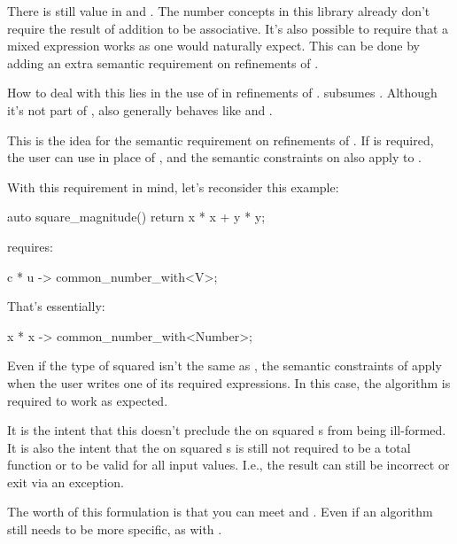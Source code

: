 \pnum
There is still value in  and .
The number concepts in this library
already don't require the result of addition to be associative.
It's also possible to require that a mixed expression works as one would naturally expect.
This can be done by adding an extra semantic requirement on refinements of .

\pnum
How to deal with this lies in the use of  in refinements of .
 subsumes .
Although it's not part of ,
 also generally behaves like  and .

\pnum
This is the idea for the semantic requirement on refinements of .
If  is required,
the user can use  in place of , and
the semantic constraints on  also apply to .

\pnum
With this requirement in mind, let's reconsider this example:
\begin{codeblock}
auto square_magnitude() { return x * x + y * y; }
\end{codeblock}
 requires:
\begin{codeblock}
{ c * u } -> common_number_with<V>;
\end{codeblock}
That's essentially:
\begin{codeblock}
{ x * x } -> common_number_with<Number>;
\end{codeblock}
Even if the type of  squared isn't the same as ,
the semantic constraints of  apply
when the user writes one of its required expressions.
In this case, the algorithm is required to work as expected.

\pnum
It is the intent that this doesn't preclude the \tcode{+} on squared s from being ill-formed.
It is also the intent that the \tcode{+} on squared s
is still not required to be a total function
or to be valid for all input values.
I.e., the result can still be incorrect or exit via an exception.

\pnum
The worth of this formulation is that you can meet  and .
Even if an algorithm still needs to be more specific, as with .

\pnum
\wheredevelisat
